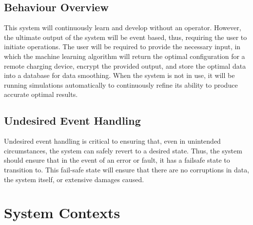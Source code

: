 \documentclass[12pt, titlepage]{article}
\begin{document}
\subsection{Behaviour Overview}
This system will continuously learn and develop without an operator. However, the ultimate output of the system will be event based, thus, requiring the user to initiate operations. The user will be required to provide the necessary input, in which the machine learning algorithm will return the optimal configuration for a remote charging device, encrypt the provided output, and store the optimal data into a database for data smoothing. When the system is not in use, it will be running simulations automatically to continuously refine its ability to produce accurate optimal results.
\subsection{Undesired Event Handling}
Undesired event handling is critical to ensuring that, even in unintended circumstances, the system can safely revert to a desired state. Thus, the system should ensure that in the event of an error or fault, it has a failsafe state to transition to. This fail-safe state will ensure that there are no corruptions in data, the system itself, or extensive damages caused. 

\section{System Contexts}
\end{document}

